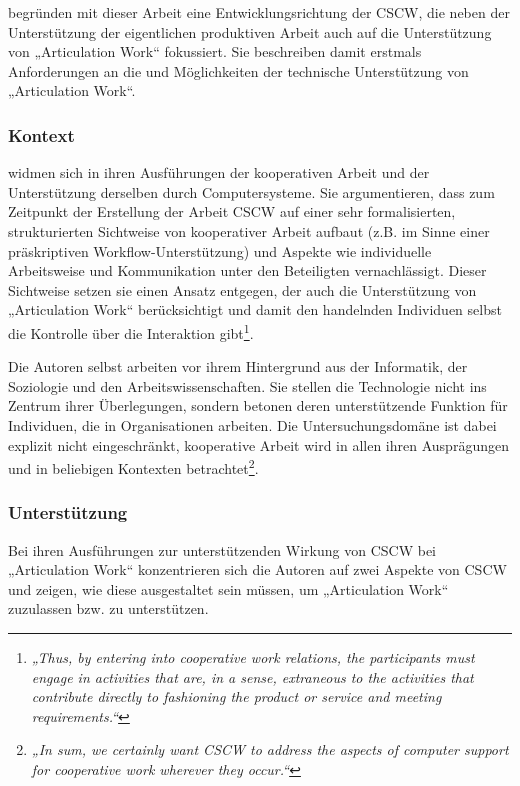 \citet{Schmidt92} begründen mit dieser Arbeit eine Entwicklungsrichtung der \gls{CSCW}, die neben der Unterstützung der eigentlichen produktiven Arbeit auch auf die Unterstützung von „Articulation Work“ fokussiert. Sie beschreiben damit erstmals Anforderungen an die und Möglichkeiten der technische Unterstützung von „Articulation Work“.

\subsubsection{Kontext}

\citet{Schmidt92} widmen sich in ihren Ausführungen der kooperativen Arbeit und der Unterstützung derselben durch Computersysteme. Sie argumentieren, dass zum Zeitpunkt der Erstellung der Arbeit \gls{CSCW} auf einer sehr formalisierten, strukturierten Sichtweise von kooperativer Arbeit aufbaut (z.B. im Sinne einer präskriptiven Workflow-Unterstützung) und Aspekte wie individuelle Arbeitsweise und Kommunikation unter den Beteiligten vernachlässigt. Dieser Sichtweise setzen sie einen Ansatz entgegen, der auch die Unterstützung von „Articulation Work“ berücksichtigt und damit den handelnden Individuen selbst die Kontrolle über die Interaktion gibt\footnote{\emph{„Thus, by entering into cooperative work relations, the participants must engage in activities that are, in a sense, extraneous to the activities that contribute directly to fashioning the product or service and meeting requirements.“}\citep[][S. 8]{Schmidt92}}.

Die Autoren selbst arbeiten vor ihrem Hintergrund aus der Informatik, der Soziologie und den Arbeitswissenschaften. Sie stellen die Technologie nicht ins Zentrum ihrer Überlegungen, sondern betonen deren unterstützende Funktion für  Individuen, die in Organisationen arbeiten. Die Untersuchungsdomäne ist dabei explizit nicht eingeschränkt, kooperative Arbeit wird in allen ihren Ausprägungen und in beliebigen Kontexten betrachtet\footnote{\emph{„In sum, we certainly want CSCW to address the aspects of computer support for cooperative work wherever they occur.“}\citep[][S. 11]{Schmidt92}}.

\subsubsection{Unterstützung}

Bei ihren Ausführungen zur unterstützenden Wirkung von \gls{CSCW} bei „Articulation Work“ konzentrieren sich die Autoren auf zwei Aspekte von \gls{CSCW} und zeigen, wie diese ausgestaltet sein müssen, um „Articulation Work“ zuzulassen bzw. zu unterstützen. 

